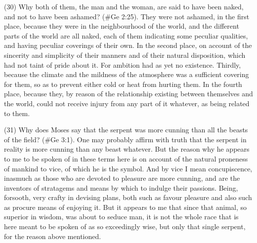 (30) Why both of them, the man and the woman, are said to have been naked, and not to have
been ashamed? (\#Ge 2:25). They were not ashamed, in the first place, because they were in
the neighbourhood of the world, and the different parts of the world are all naked, each of them
indicating some peculiar qualities, and having peculiar coverings of their own. In the second place,
on account of the sincerity and simplicity of their manners and of their natural disposition, which
had not taint of pride about it. For ambition had as yet no existence. Thirdly, because the climate
and the mildness of the atmosphere was a sufficient covering for them, so as to prevent either cold
or heat from hurting them. In the fourth place, because they, by reason of the relationship existing
between themselves and the world, could not receive injury from any part of it whatever, as being
related to them.

(31) Why does Moses say that the serpent was more cunning than all the beasts of the field?
(\#Ge 3:1). One may probably affirm with truth that the serpent in reality is more cunning than
any beast whatever. But the reason why he appears to me to be spoken of in these terms here is
on account of the natural proneness of mankind to vice, of which he is the symbol. And by vice I
mean concupiscence, inasmuch as those who are devoted to pleasure are more cunning, and are
the inventors of stratagems and means by which to indulge their passions. Being, forsooth, very
crafty in devising plans, both such as favour pleasure and also such as procure means of enjoying
it. But it appears to me that since that animal, so superior in wisdom, was about to seduce man, it
is not the whole race that is here meant to be spoken of as so exceedingly wise, but only that
single serpent, for the reason above mentioned.

